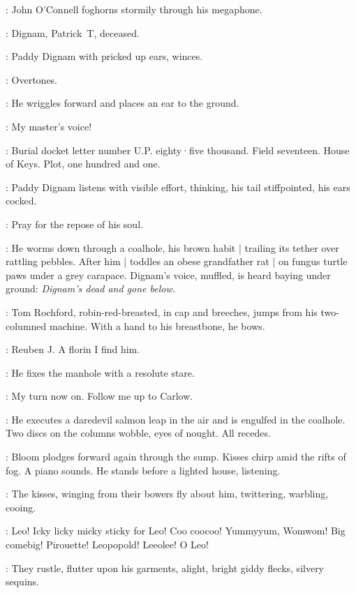 :
John O'Connell foghorns stormily through his megaphone.

\OConnell:
Dignam,
Patrick~T,
deceased.

:
Paddy Dignam with pricked up ears,
winces.

\Dignam:
Overtones.

:
He wriggles forward and places an ear to the ground.

\Dignam:
My master's voice!

\OConnell:
Burial docket letter number U.P.
eighty·five thousand.
Field seventeen.
House of Keys.
Plot,
one hundred and one.

:
Paddy Dignam listens with visible effort,
thinking,
his tail stiffpointed,
his ears cocked.

\Dignam:
Pray for the repose of his soul.

:
He worms down through a coalhole,
his brown habit |
trailing its tether over rattling pebbles.
After him |
toddles an obese grandfather rat |
on fungus turtle paws under a grey carapace.
Dignam's voice,
muffled,
is heard baying under ground:
\emph{Dignam's dead and gone below.}

:
Tom Rochford,
robin-red-breasted,
in cap and breeches,
%
jumps from his two-columned machine.
With a hand to his breastbone,
he bows.

\Rochford:
Reuben J.
A florin I find him.

:
He fixes the manhole with a resolute stare.

\Rochford:
My turn now on.
Follow me up to Carlow.

:
He executes a daredevil salmon leap in the air and is engulfed in the coalhole.
Two discs on the columns wobble,
eyes of nought.
All recedes.

:
Bloom plodges forward again through the sump.
Kisses chirp amid the rifts of fog.
A piano sounds.
He stands before a lighted house,
listening.

:
The kisses,
winging from their bowers fly about him,
twittering,
warbling,
cooing.

\Kisses:
Leo!
Icky licky micky sticky for Leo!
Coo coocoo!
Yummyyum,
Womwom!
Big comebig!
Pirouette!
Leopopold!
Leeolee!
O Leo!

:
They rustle,
flutter upon his garments,
alight,
bright giddy flecks,
silvery sequins.

